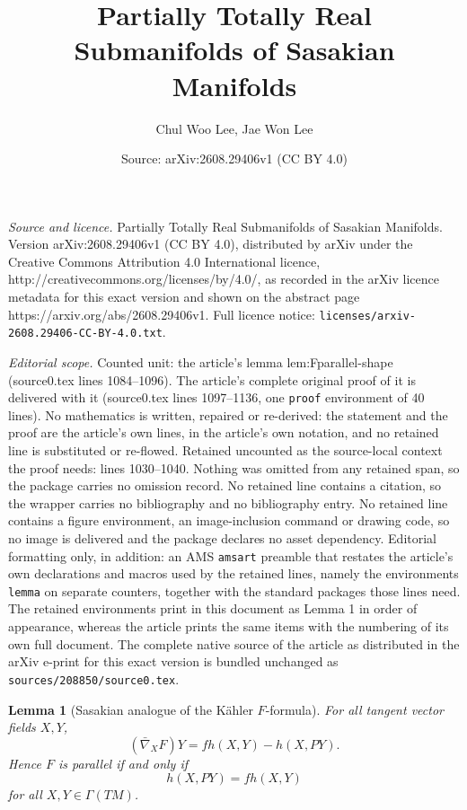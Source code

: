 \documentclass[10pt,a4paper]{amsart}
\title{Partially Totally Real Submanifolds of Sasakian Manifolds}
\author{Chul Woo Lee, Jae Won Lee}
\date{Source: arXiv:2608.29406v1 (CC BY 4.0)}
\newtheorem{lemma}{Lemma}
\begin{document}
\maketitle

\noindent\emph{Source and licence.} Partially Totally Real Submanifolds of Sasakian Manifolds. Version arXiv:2608.29406v1 (CC BY 4.0), distributed by arXiv under the Creative Commons Attribution 4.0 International licence, http://creativecommons.org/licenses/by/4.0/, as recorded in the arXiv licence metadata for this exact version and shown on the abstract page https://arxiv.org/abs/2608.29406v1. Full licence notice: \texttt{licenses/arxiv-2608.29406-CC-BY-4.0.txt}.\par\smallskip

\noindent\textit{Editorial scope.} Counted unit: the article's lemma lem:Fparallel-shape (source0.tex lines 1084--1096). The article's complete original proof of it is delivered with it (source0.tex lines 1097--1136, one \texttt{proof} environment of 40 lines). No mathematics is written, repaired or re-derived: the statement and the proof are the article's own lines, in the article's own notation, and no retained line is substituted or re-flowed.  Retained uncounted as the source-local context the proof needs: lines 1030--1040.  Nothing was omitted from any retained span, so the package carries no omission record.  No retained line contains a citation, so the wrapper carries no bibliography and no bibliography entry.  No retained line contains a figure environment, an image-inclusion command or drawing code, so no image is delivered and the package declares no asset dependency.  Editorial formatting only, in addition: an AMS \texttt{amsart} preamble that restates the article's own declarations and macros used by the retained lines, namely the environments \texttt{lemma} on separate counters, together with the standard packages those lines need.  The retained environments print in this document as Lemma 1 in order of appearance, whereas the article prints the same items with the numbering of its own full document.  The complete native source of the article as distributed in the arXiv e-print for this exact version is bundled unchanged as \texttt{sources/208850/source0.tex}.
\begin{lemma}[Sasakian analogue of the K\"ahler $F$-formula]\label{lem:parallelF}
For all tangent vector fields $X,Y$,
\begin{equation}\label{eq:nablaF}
 (\bar\nabla_XF)Y=f h(X,Y)-h(X,PY).
\end{equation}
Hence $F$ is parallel if and only if
\begin{equation}\label{eq:Fparallel-h}
 h(X,PY)=f h(X,Y)
\end{equation}
for all $X,Y\in\Gamma(TM)$.
\end{lemma}
\end{document}
